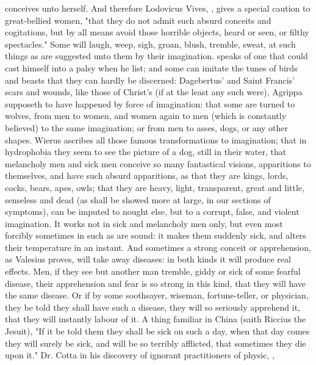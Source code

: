 conceives unto herself. And therefore Lodovicus Vives,
, gives a special caution to
great-bellied women, "that they do not admit such absurd
conceits and cogitations, but by all means avoid those horrible objects, heard
or seen, or filthy spectacles." Some will laugh, weep, sigh, groan, blush,
tremble, sweat, at such things as are suggested unto them by their imagination.
\Avicenna{} speaks of one that could cast himself into a palsy when he list; and
some can imitate the tunes of birds and beasts that they can hardly be
discerned: Dagebertus' and Saint Francis' scars and wounds, like those of
Christ's (if at the least any such were), Agrippa
supposeth to have happened by force of imagination: that some are turned to
wolves, from men to women, and women again to men (which is constantly
believed) to the same imagination; or from men to asses, dogs, or any other
shapes. Wierus ascribes all those famous transformations
to imagination; that in hydrophobia they seem to see the picture of a dog,
still in their water, that melancholy men and sick men
conceive so many fantastical visions, apparitions to themselves, and have such
absurd apparitions, as that they are kings, lords, cocks, bears, apes, owls;
that they are heavy, light, transparent, great and little, senseless and dead
(as shall be showed more at large, in our sections of
symptoms), can be imputed to nought else, but to a corrupt, false, and violent
imagination. It works not in sick and melancholy men only, but even most
forcibly sometimes in such as are sound: it makes them suddenly sick, and
alters their temperature in an instant. And sometimes a
strong conceit or apprehension, as Valesius proves, will
take away diseases: in both kinds it will produce real effects. Men, if they
see but another man tremble, giddy or sick of some fearful disease, their
apprehension and fear is so strong in this kind, that they will have the same
disease. Or if by some soothsayer, wiseman, fortune-teller, or physician, they
be told they shall have such a disease, they will so seriously apprehend it,
that they will instantly labour of it. A thing familiar in China (saith Riccius
the Jesuit), "If it be told them they shall be sick on
such a day, when that day comes they will surely be sick, and will be so
terribly afflicted, that sometimes they die upon it." Dr. Cotta in his
discovery of ignorant practitioners of physic, ,
